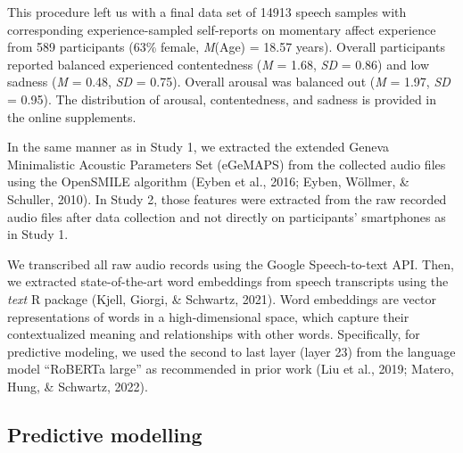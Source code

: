 \documentclass[
  english,
  man,floatsintext]{apa6}
\begin{document}
This procedure left us with a final data set of 14913 speech samples with corresponding experience-sampled self-reports on momentary affect experience from 589 participants (63\% female, \emph{M}(Age) = 18.57 years). Overall participants reported balanced experienced contentedness (\emph{M} = 1.68, \emph{SD} = 0.86) and low sadness (\emph{M} = 0.48, \emph{SD} = 0.75). Overall arousal was balanced out (\emph{M} = 1.97, \emph{SD} = 0.95). The distribution of arousal, contentedness, and sadness is provided in the online supplements.

In the same manner as in Study 1, we extracted the extended Geneva Minimalistic Acoustic Parameters Set (eGeMAPS) from the collected audio files using the OpenSMILE algorithm (Eyben et al., 2016; Eyben, Wöllmer, \& Schuller, 2010). In Study 2, those features were extracted from the raw recorded audio files after data collection and not directly on participants' smartphones as in Study 1.

We transcribed all raw audio records using the Google Speech-to-text API. Then, we extracted state-of-the-art word embeddings from speech transcripts using the \emph{text} R package (Kjell, Giorgi, \& Schwartz, 2021). Word embeddings are vector representations of words in a high-dimensional space, which capture their contextualized meaning and relationships with other words. Specifically, for predictive modeling, we used the second to last layer (layer 23) from the language model ``RoBERTa large'' as recommended in prior work (Liu et al., 2019; Matero, Hung, \& Schwartz, 2022).

\hypertarget{predictive-modelling}{%
\subsection{Predictive modelling}\label{predictive-modelling}}
\end{document}

